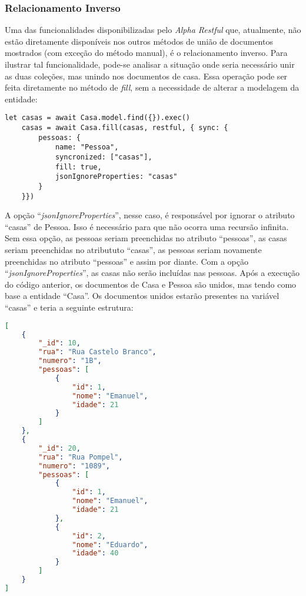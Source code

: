 \subsubsection{Relacionamento Inverso}

Uma das funcionalidades disponibilizadas pelo \textit{Alpha Restful} que, atualmente, não estão diretamente disponíveis nos outros métodos de união de documentos mostrados (com exceção do método manual), é o relacionamento inverso. Para ilustrar tal funcionalidade, pode-se analisar a situação onde seria necessário unir as duas coleções, mas unindo nos documentos de casa. Essa operação pode ser feita diretamente no método de \textit{fill}, sem a necessidade de alterar a modelagem da entidade:

\begin{lstlisting}[style=ES6, caption={União de Documentos em Relacionamento Inverso}]
    let casas = await Casa.model.find({}).exec()
    casas = await Casa.fill(casas, restful, { sync: {
        pessoas: {
            name: "Pessoa",
            syncronized: ["casas"],
            fill: true,
            jsonIgnoreProperties: "casas"
        }
    }})
\end{lstlisting}

A opção ``\textit{jsonIgnoreProperties}'', nesse caso, é responsável por ignorar o atributo ``casas'' de Pessoa. Isso é necessário para que não ocorra uma recursão infinita. Sem essa opção, as pessoas seriam preenchidas no atributo ``pessoas'', as casas seriam preenchidas no atribututo ``casas'', as pessoas seriam novamente preenchidas no atributo ``pessoas'' e assim por diante. Com a opção ``\textit{jsonIgnoreProperties}'', as casas não serão incluídas nas pessoas. Após a execução do código anterior, os documentos de Casa e Pessoa são unidos, mas tendo como base a entidade ``Casa''. Os documentos unidos estarão presentes na variável ``casas'' e teria a seguinte estrutura:

\newpage

\begin{lstlisting}[language=json, caption={Junção de Documentos em ``Casa''}]
[
    {
        "_id": 10,
        "rua": "Rua Castelo Branco",
        "numero": "1B",
        "pessoas": [
            {
                "id": 1,
                "nome": "Emanuel",
                "idade": 21
            }
        ]
    },
    {
        "_id": 20,
        "rua": "Rua Pompel",
        "numero": "1089",
        "pessoas": [
            {
                "id": 1,
                "nome": "Emanuel",
                "idade": 21
            },
            {
                "id": 2,
                "nome": "Eduardo",
                "idade": 40
            }
        ]
    }
]
\end{lstlisting}

